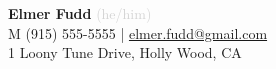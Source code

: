 \documentclass[letterpaper,11pt]{article}
\begin{document}
	{\textbf{\Huge Elmer Fudd}} \textcolor{lightgray}{(he/him)}\vspace{0.2em} \\
	M (915) 555-5555\vspace{0.2em} |
	\hspace{0.2em}\href{elmer.fudd@gmail.com}{elmer.fudd@gmail.com} \vspace{0.2em} \\
	1 Loony Tune Drive, Holly Wood, CA
	\vspace{1em}
\end{document}
